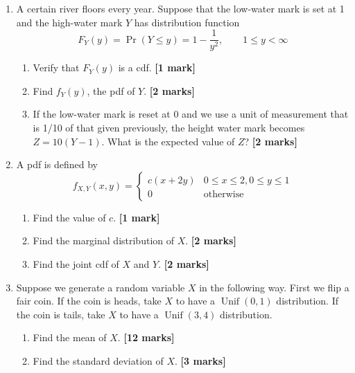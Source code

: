 \documentclass[
]{book}
\providecommand{\tightlist}{%
  \setlength{\itemsep}{0pt}\setlength{\parskip}{0pt}}
\DeclareMathOperator{\Unif}{Unif}
\theoremstyle{definition}
\theoremstyle{definition}
\theoremstyle{definition}
\theoremstyle{definition}
\theoremstyle{remark}
\begin{document}
\begin{enumerate}
\def\labelenumi{\arabic{enumi}.}
\item
  A certain river floors every year. Suppose that the low-water mark is set at 1 and the high-water mark \(Y\) has distribution function
  \[
  F_Y(y) = \Pr(Y\leq y) = 1 - \frac{1}{y^2}, \hspace{2em} 1\leq y<\infty
  \]

  \begin{enumerate}
  \def\labelenumii{(\alph{enumii})}
  \tightlist
  \item
    Verify that \(F_Y(y)\) is a cdf. \textbf{{[}1 mark{]}}
  \item
    Find \(f_Y(y)\), the pdf of \(Y\). \textbf{{[}2 marks{]}}
  \item
    If the low-water mark is reset at 0 and we use a unit of measurement that is 1/10 of that given previously, the height water mark becomes \(Z=10(Y-1)\). What is the expected value of \(Z\)? \textbf{{[}2 marks{]}}
  \end{enumerate}
\item
  A pdf is defined by
  \[
  f_{X,Y}(x,y) = \begin{cases}
   c(x+2y) &0\leq x \leq 2, 0\leq y \leq 1 \\
   0&\text{otherwise}
  \end{cases}
  \]

  \begin{enumerate}
  \def\labelenumii{(\alph{enumii})}
  \tightlist
  \item
    Find the value of \(c\). \textbf{{[}1 mark{]}}
  \item
    Find the marginal distribution of \(X\). \textbf{{[}2 marks{]}}
  \item
    Find the joint cdf of \(X\) and \(Y\). \textbf{{[}2 marks{]}}
  \end{enumerate}
\item
  Suppose we generate a random variable \(X\) in the following way. First we flip a fair coin. If the coin is heads, take \(X\) to have a \(\Unif(0,1)\) distribution. If the coin is tails, take \(X\) to have a \(\Unif(3,4)\) distribution.

  \begin{enumerate}
  \def\labelenumii{(\alph{enumii})}
  \tightlist
  \item
    Find the mean of \(X\). \textbf{{[}12 marks{]}}
  \item
    Find the standard deviation of \(X\). \textbf{{[}3 marks{]}}
  \end{enumerate}
\end{enumerate}
\end{document}
